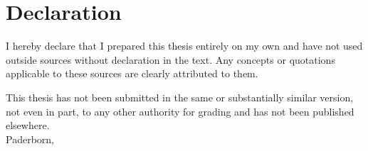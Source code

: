 \chapter*{Declaration}
	I hereby declare that I prepared this thesis entirely on my own and have not used outside sources without declaration in the text.
	Any concepts or quotations applicable to these sources are clearly attributed to them.

	This thesis has not been submitted in the same or substantially similar version, not even in part, to any other authority for grading and has not been published elsewhere.\\[27pt]
	
	Paderborn, \DateOfSubmission \\[15pt]
	
	\Author
